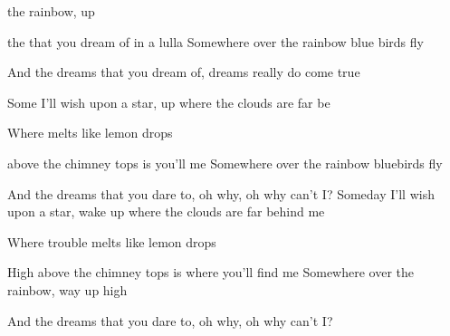 

\zs

  the rainbow,  up 

 the  that you dream of  in a lulla  
\ks
\zs
Somewhere over the rainbow blue birds fly

And the dreams that you dream of, dreams really do come true
\ks
\zr

Some I'll wish upon a star,  up where the clouds are far be

Where melts like lemon drops

 above the chimney tops is  you'll me
\kr
\zs
Somewhere over the rainbow bluebirds fly

And the dreams that you dare to, oh why, oh why can't I?
\ks
\zr
Someday I'll wish upon a star, wake up where the clouds are far behind me

Where trouble melts like lemon drops

High above the chimney tops is where you'll find me
\kr
\zs
Somewhere over the rainbow, way up high

And the dreams that you dare to, oh why, oh why can't I?
\ks

\kp



